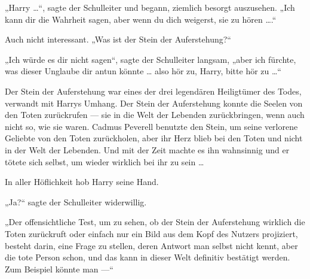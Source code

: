 „Harry …“, sagte der Schulleiter und begann, ziemlich besorgt auszusehen.
„Ich kann dir die Wahrheit sagen, aber wenn du dich weigerst, sie zu hören ….“

Auch nicht interessant.
„Was ist der Stein der Auferstehung?“

„Ich würde es dir nicht sagen“, sagte der Schulleiter langsam, „aber ich fürchte, was dieser Unglaube dir antun könnte … also hör zu, Harry, bitte hör zu …“

Der Stein der Auferstehung war eines der drei legendären Heiligtümer des Todes, verwandt mit Harrys Umhang. Der Stein der Auferstehung konnte die Seelen von den Toten zurückrufen — sie in die Welt der Lebenden zurückbringen, wenn auch nicht so, wie sie waren. Cadmus Peverell benutzte den Stein, um seine verlorene Geliebte von den Toten zurückholen, aber ihr Herz blieb bei den Toten und nicht in der Welt der Lebenden. Und mit der Zeit machte es ihn wahnsinnig und er tötete sich selbst, um wieder wirklich bei ihr zu sein …

In aller Höflichkeit hob Harry seine Hand.

„Ja?“ sagte der Schulleiter widerwillig.

„Der offensichtliche Test, um zu sehen, ob der Stein der Auferstehung wirklich die Toten zurückruft oder einfach nur ein Bild aus dem Kopf des Nutzers projiziert, besteht darin, eine Frage zu stellen, deren Antwort man selbst nicht kennt, aber die tote Person schon, und das kann in dieser Welt definitiv bestätigt werden. Zum Beispiel könnte man —“

